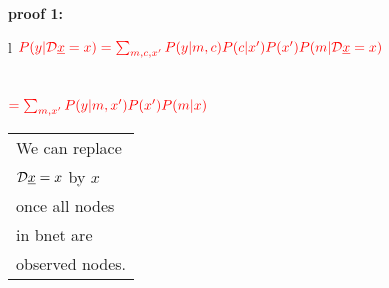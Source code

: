 \begin{claim}
\label{cl-decFrontDoor}
\decFrontDoor
\end{claim}

\proof


{\bf * proof 1:}
\\
\begin{longtable}{l}
$\color{red}
P(y|{\cal D}{\underline{x}}=x)=
\sum_{m, c, x'}
P(y|m, c)P(c|x')P(x')
P(m|{\cal D}{\underline{x}}=x)$
\\
\\
\xymatrix{\\=}
\\
$\color{red}=
\sum_{m,x'}
P(y|m, x')
P(x')
P(m|x)$
\\
\xymatrix{\\=}
\begin{tabular}{l}
We can replace\\
${\cal D}{\underline{x}}=x$
by $x$ 
\\once all nodes
\\in bnet are
\\observed nodes. 
\end{tabular}
\end{longtable}



